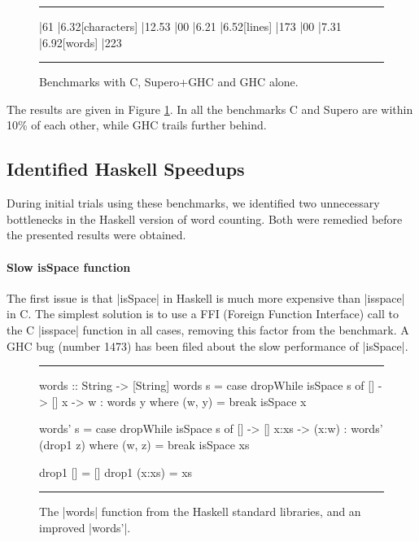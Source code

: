 \documentclass{llncs}
\newenvironment{fig}
    {\begin{figure}[tbp]\hrule}
    {\end{figure}}
\newcommand{\figend}{\hrule}
\begin{document}
\begin{fig}
\vspace{7mm}
\begin{barenv}
 
\bar{6}{1}
\bar{6.3}{2}[characters]
\bar{12.5}{3}
\bar{0}{0}
\bar{6.2}{1}
\bar{6.5}{2}[lines]
\bar{17}{3}
\bar{0}{0}
\bar{7.3}{1}
\bar{6.9}{2}[words]
\bar{22}{3}
\end{barenv}
\vspace{7mm}
\figend
\caption{Benchmarks with C, Supero+GHC and GHC alone.}
\label{fig:c_results}
\end{fig}

The results are given in Figure \ref{fig:c_results}. In all the benchmarks C and Supero are within 10\% of each other, while GHC trails further behind.

\subsection{Identified Haskell Speedups}

During initial trials using these benchmarks, we identified two unnecessary bottlenecks in the Haskell version of word counting. Both were remedied before the presented results were obtained.

\paragraph{Slow \textsf{isSpace} function}

The first issue is that |isSpace| in Haskell is much more expensive than |isspace| in C. The simplest solution is to use a FFI (Foreign Function Interface) \cite{spj:awkward_squad} call to the C |isspace| function in all cases, removing this factor from the benchmark. A GHC bug (number 1473) has been filed about the slow performance of |isSpace|.

\begin{fig}
\begin{code}
words :: String -> [String]
words s = case  dropWhile isSpace s of
                []  ->  []
                x   ->  w : words y
                        where (w, y) = break isSpace x

words' s = case  dropWhile isSpace s of
                 []    ->  []
                 x:xs  ->  (x:w) : words' (drop1 z)
                           where (w, z) = break isSpace xs

drop1 []      = []
drop1 (x:xs)  = xs
\end{code}
\figend
\caption{The |words| function from the Haskell standard libraries, and an improved |words'|.}
\label{fig:words}
\end{fig}
\end{document}
